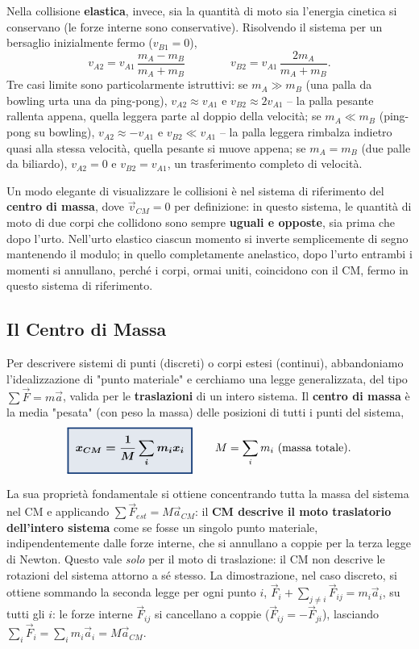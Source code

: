 \documentclass[a4paper,11pt]{article}
\newcommand{\keyeq}[1]{{\setlength{\fboxsep}{6pt}\setlength{\fboxrule}{1.3pt}\fcolorbox{chapblue}{chapblue!12}{\boldmath$\displaystyle #1$}}}
\begin{document}
Nella collisione \textbf{elastica}, invece, sia la quantità di moto sia l'energia cinetica si conservano (le forze interne sono conservative). Risolvendo il sistema per un bersaglio inizialmente fermo ($v_{B1}=0$),
\[
v_{A2} = v_{A1}\,\frac{m_A-m_B}{m_A+m_B} \qquad\qquad v_{B2} = v_{A1}\,\frac{2m_A}{m_A+m_B}.
\]
Tre casi limite sono particolarmente istruttivi: se $m_A\gg m_B$ (una palla da bowling urta una da ping-pong), $v_{A2}\approx v_{A1}$ e $v_{B2}\approx2v_{A1}$ -- la palla pesante rallenta appena, quella leggera parte al doppio della velocità; se $m_A\ll m_B$ (ping-pong su bowling), $v_{A2}\approx-v_{A1}$ e $v_{B2}\ll v_{A1}$ -- la palla leggera rimbalza indietro quasi alla stessa velocità, quella pesante si muove appena; se $m_A=m_B$ (due palle da biliardo), $v_{A2}=0$ e $v_{B2}=v_{A1}$, un trasferimento completo di velocità.

Un modo elegante di visualizzare le collisioni è nel sistema di riferimento del \textbf{centro di massa}, dove $\vec v_{CM}=0$ per definizione: in questo sistema, le quantità di moto di due corpi che collidono sono sempre \textbf{uguali e opposte}, sia prima che dopo l'urto. Nell'urto elastico ciascun momento si inverte semplicemente di segno mantenendo il modulo; in quello completamente anelastico, dopo l'urto entrambi i momenti si annullano, perché i corpi, ormai uniti, coincidono con il CM, fermo in questo sistema di riferimento.

\subsection{Il Centro di Massa}

Per descrivere sistemi di punti (discreti) o corpi estesi (continui), abbandoniamo l'idealizzazione di "punto materiale" e cerchiamo una legge generalizzata, del tipo $\sum\vec F=m\vec a$, valida per le \textbf{traslazioni} di un intero sistema. Il \textbf{centro di massa} è la media "pesata" (con peso la massa) delle posizioni di tutti i punti del sistema,
\[
\keyeq{x_{CM} = \frac{1}{M}\sum_i m_i x_i} \qquad M=\sum_i m_i \text{ (massa totale)}.
\]

La sua proprietà fondamentale si ottiene concentrando tutta la massa del sistema nel CM e applicando $\sum\vec F_{est}=M\vec a_{CM}$: il \textbf{CM descrive il moto traslatorio dell'intero sistema} come se fosse un singolo punto materiale, indipendentemente dalle forze interne, che si annullano a coppie per la terza legge di Newton. Questo vale \emph{solo} per il moto di traslazione: il CM non descrive le rotazioni del sistema attorno a sé stesso. La dimostrazione, nel caso discreto, si ottiene sommando la seconda legge per ogni punto $i$, $\vec F_i+\sum_{j\neq i}\vec F_{ij}=m_i\vec a_i$, su tutti gli $i$: le forze interne $\vec F_{ij}$ si cancellano a coppie ($\vec F_{ij}=-\vec F_{ji}$), lasciando $\sum_i\vec F_i=\sum_i m_i\vec a_i=M\vec a_{CM}$.
\end{document}

